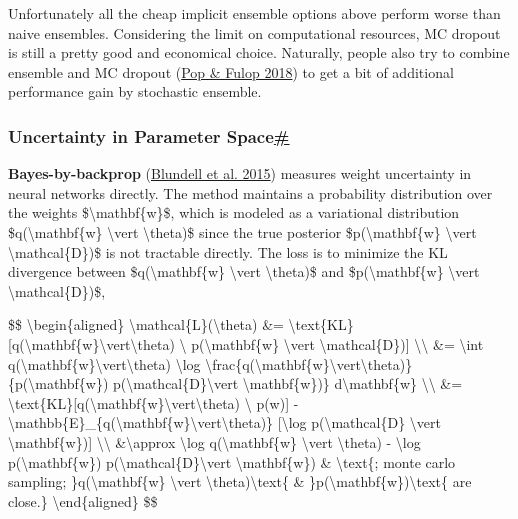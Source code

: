 Unfortunately all the cheap implicit ensemble options above perform worse than naive ensembles. Considering the limit on computational resources, MC dropout is still a pretty good and economical choice. Naturally, people also try to combine ensemble and MC dropout (\href{https://arxiv.org/abs/1811.03897}{Pop \& Fulop 2018}) to get a bit of additional performance gain by stochastic ensemble.

\subsubsection{\texorpdfstring{Uncertainty in Parameter Space\hyperref[uncertainty-in-parameter-space]{\#}}{Uncertainty in Parameter Space\#}}\label{uncertainty-in-parameter-space}

\textbf{Bayes-by-backprop} (\href{https://arxiv.org/abs/1505.05424}{Blundell et al. 2015}) measures weight uncertainty in neural networks directly. The method maintains a probability distribution over the weights \$\textbackslash mathbf\{w\}\$, which is modeled as a variational distribution \$q(\textbackslash mathbf\{w\} \textbackslash vert \textbackslash theta)\$ since the true posterior \$p(\textbackslash mathbf\{w\} \textbackslash vert \textbackslash mathcal\{D\})\$ is not tractable directly. The loss is to minimize the KL divergence between \$q(\textbackslash mathbf\{w\} \textbackslash vert \textbackslash theta)\$ and \$p(\textbackslash mathbf\{w\} \textbackslash vert \textbackslash mathcal\{D\})\$,

\$\$ \textbackslash begin\{aligned\} \textbackslash mathcal\{L\}(\textbackslash theta) \&= \textbackslash text\{KL\}{[}q(\textbackslash mathbf\{w\}\textbackslash vert\textbackslash theta) \textbackslash\textbar{} p(\textbackslash mathbf\{w\} \textbackslash vert \textbackslash mathcal\{D\}){]} \textbackslash\textbackslash{} \&= \textbackslash int q(\textbackslash mathbf\{w\}\textbackslash vert\textbackslash theta) \textbackslash log \textbackslash frac\{q(\textbackslash mathbf\{w\}\textbackslash vert\textbackslash theta)\}\{p(\textbackslash mathbf\{w\}) p(\textbackslash mathcal\{D\}\textbackslash vert \textbackslash mathbf\{w\})\} d\textbackslash mathbf\{w\} \textbackslash\textbackslash{} \&= \textbackslash text\{KL\}{[}q(\textbackslash mathbf\{w\}\textbackslash vert\textbackslash theta) \textbackslash\textbar{} p(w){]} - \textbackslash mathbb\{E\}\_\{q(\textbackslash mathbf\{w\}\textbackslash vert\textbackslash theta)\} {[}\textbackslash log p(\textbackslash mathcal\{D\} \textbackslash vert \textbackslash mathbf\{w\}){]} \textbackslash\textbackslash{} \&\textbackslash approx \textbackslash log q(\textbackslash mathbf\{w\} \textbackslash vert \textbackslash theta) - \textbackslash log p(\textbackslash mathbf\{w\}) p(\textbackslash mathcal\{D\}\textbackslash vert \textbackslash mathbf\{w\}) \& \textbackslash text\{; monte carlo sampling; \}q(\textbackslash mathbf\{w\} \textbackslash vert \textbackslash theta)\textbackslash text\{ \& \}p(\textbackslash mathbf\{w\})\textbackslash text\{ are close.\} \textbackslash end\{aligned\} \$\$


